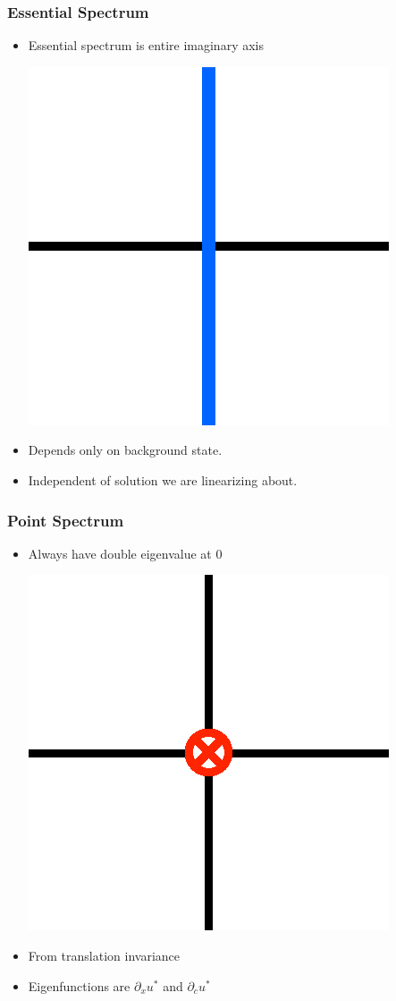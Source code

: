 \documentclass[16pt]{beamer}
\begin{document}
\begin{frame}
	\frametitle{Essential Spectrum}
	\fontsize{16}{7.2}\selectfont
	\begin{itemize}
		\item Essential spectrum is entire imaginary axis
			\begin{center}
			\includegraphics[width=0.3\linewidth]{images/essspec1.eps}
			\end{center}

		\item Depends only on background state.
		\vspace{0.5cm}
		\item Independent of solution we are linearizing about.
	\end{itemize}
\end{frame}


\begin{frame}
	\frametitle{Point Spectrum}
	\fontsize{16}{7.2}\selectfont
	\begin{itemize}
		\item Always have double eigenvalue at 0
		\begin{center}
			\includegraphics[width=0.3\linewidth]{images/eigsingle.eps}
		\end{center}
		\item From translation invariance
		\vspace{0.5cm}
		\item Eigenfunctions are $\partial_x u^*$ and $\partial_c u^*$
	\end{itemize}
\end{frame}
\end{document}
